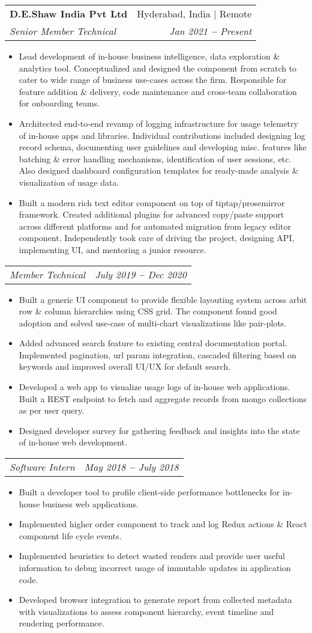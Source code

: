 \documentclass[letterpaper,11pt]{article}
\makeatletter
\newcommand{\resumeItem}[1]{
  \item\small{
    {#1 \vspace{-2pt}}
  }
}
\newcommand{\resumeSubheading}[4]{
  \vspace{-2pt}\item
    \begin{tabular*}{0.97\textwidth}[t]{l@{\extracolsep{\fill}}r}
      \textbf{#1} & #2 \\
      \textit{\small#3} & \textit{\small #4} \\
    \end{tabular*}\vspace{-7pt}
}
\newcommand{\resumeSubSubheading}[2]{
    \vspace{-2pt}\item
    \begin{tabular*}{0.97\textwidth}{l@{\extracolsep{\fill}}r}
      \textit{\small#1} & \textit{\small #2} \\
    \end{tabular*}\vspace{-7pt}
}
\newcommand{\resumeItemListStart}{\begin{itemize}}
\newcommand{\resumeItemListEnd}{\end{itemize}\vspace{-5pt}}
\makeatother
\begin{document}
\resumeSubheading
{D.E.Shaw India Pvt Ltd}{Hyderabad, India $|$ Remote}
{Senior Member Technical}{Jan 2021 \textbf{--} Present}
\resumeItemListStart
\resumeItem{Lead development of in-house business intelligence, data exploration \& analytics tool. Conceptualized and designed the component from scratch to cater to wide range of business use-cases across the firm. Responsible for feature addition \& delivery, code maintenance and cross-team collaboration for onboarding teams.}
\resumeItem{Architected end-to-end revamp of logging infrastructure for usage telemetry of in-house apps and libraries. Individual contributions included designing log record schema, documenting user guidelines and developing misc. features like batching \& error handling mechanisms, identification of user sessions, etc. Also designed dashboard configuration templates for ready-made analysis \& visualization of usage data.}
\resumeItem{Built a modern rich text editor component on top of tiptap/prosemirror framework. Created additional plugins for advanced copy/paste support across different platforms and for automated migration from legacy editor component. Independently took care of driving the project, designing API, implementing UI, and mentoring a junior resource.}
\resumeItemListEnd

\resumeSubSubheading
{Member Technical}{July 2019 \textbf{--} Dec 2020}
\resumeItemListStart
\resumeItem{Built a generic UI component to provide flexible layouting system across arbit row \& column hierarchies using CSS grid. The component found good adoption and solved use-case of multi-chart visualizations like pair-plots.}
\resumeItem{Added advanced search feature to existing central documentation portal. Implemented pagination, url param integration, cascaded filtering based on keywords and improved overall UI/UX for default search.}
\resumeItem{Developed a web app to visualize usage logs of in-house web applications. Built a REST endpoint to fetch and aggregate records from mongo collections as per user query.}
\resumeItem{Designed developer survey for gathering feedback and insights into the state of in-house web development.}
\resumeItemListEnd

\resumeSubSubheading
{Software Intern}{May 2018 \textbf{--} July 2018}
\resumeItemListStart
\resumeItem{Built a developer tool to profile client-side performance bottlenecks for in-house business web applications.}
\resumeItem{Implemented higher order component to track and log Redux actions \& React component life cycle events.}
\resumeItem{Implemented heuristics to detect wasted renders and provide user useful information to debug incorrect usage of immutable updates in application code.}
\resumeItem{Developed browser integration to generate report from collected metadata with visualizations to assess component hierarchy, event timeline and rendering performance.}
\resumeItemListEnd
\end{document}
